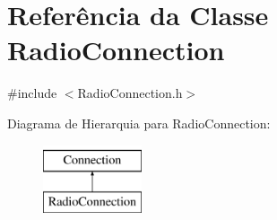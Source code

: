 \hypertarget{classRadioConnection}{\section{Referência da Classe Radio\-Connection}
\label{classRadioConnection}
}


{\ttfamily \#include $<$Radio\-Connection.\-h$>$}

Diagrama de Hierarquia para Radio\-Connection\-:\begin{figure}[H]
\begin{center}
\leavevmode
\includegraphics[height=2.000000cm]{classRadioConnection}
\end{center}
\end{figure}
